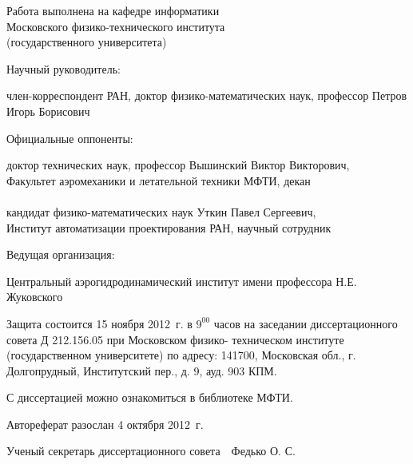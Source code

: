 \noindent
Работа выполнена на кафедре информатики\\
Московского физико-технического института\\
(государственного университета)\\

\vspace{3em}

\noindent
\begin{minipage}[t]{0.4\textwidth}
Научный руководитель:
\end{minipage}
\begin{minipage}[t]{0.6\textwidth}
член-корреспондент РАН, доктор физико-математических наук, профессор Петров Игорь Борисович
\end{minipage}

\vspace{3em}

\noindent
\begin{minipage}[t]{0.4\textwidth}
Официальные оппоненты:
\end{minipage}
\begin{minipage}[t]{0.6\textwidth}
доктор технических наук, профессор Вышинский Виктор Викторович,\\
Факультет аэромеханики и летательной техники МФТИ, декан\\
 \\
кандидат физико-математических наук Уткин Павел Сергеевич,\\
Институт автоматизации проектирования РАН, научный сотрудник
\end{minipage}

\vspace{3em}

\noindent
\begin{minipage}[t]{0.4\textwidth}
Ведущая организация:
\end{minipage}
\begin{minipage}[t]{0.6\textwidth}
Центральный аэрогидродинамический институт имени профессора Н.Е. Жуковского
\end{minipage}

\vspace{6em}

\noindent
Защита состоится 15 ноября 2012~г. в $9^{00}$ часов на заседании
диссертационного совета Д 212.156.05 при Московском физико-
техническом институте (государственном университете) по адресу:
141700, Московская обл., г. Долгопрудный, Институтский пер., д. 9, ауд.
903 КПМ.

\vspace{2em}

\noindent
С диссертацией можно ознакомиться в библиотеке МФТИ.

\vspace{2em}

\noindent
Автореферат разослан 4 октября 2012~г.

\vspace{\fill}

\noindent
Ученый секретарь диссертационного совета\ \hspace{40 mm}\ Федько О. С.


